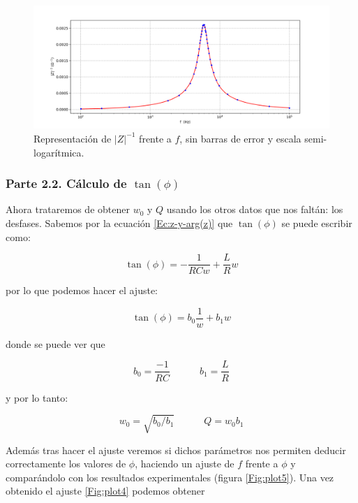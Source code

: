 \documentclass[12pt,a4paper]{article}
\newcommand{\tquad}{\quad \quad \quad}
\begin{document}
\begin{figure}[h!] \centering
\includegraphics[scale=0.60]{plot5.png}
\caption{Representación de $|Z|^{-1}$ frente a $f$, sin barras de error y escala semi-logarítmica.}
\label{Fig:plot3}
\end{figure}

\subsubsection{Parte 2.2. Cálculo de $\tan (\phi)$}

Ahora trataremos de obtener $w_0$ y $Q$ usando los otros datos que nos faltán: los desfases. Sabemos por la ecuación \ref{Ec:z-y-arg(z)} que $\tan (\phi)$ se puede escribir como:

$$
\tan (\phi) =  - \dfrac{1}{R C w} + \dfrac{L}{R} w
$$

por lo que podemos hacer el ajuste:

\begin{equation}
\tan (\phi) = b_0 \dfrac{1}{w} + b_1 w \label{Ec:ajuste2}
\end{equation}

donde se puede ver que

\begin{equation}
b_0 = \dfrac{-1}{RC} \tquad b_1 = \dfrac{L}{R} \label{Ec:parametros2}
\end{equation}

y por lo tanto:

\begin{equation}
w_0= \sqrt{b_0/b_1} \tquad Q =  w_0 b_1 \label{Ec:valores2}
\end{equation}

Además tras hacer el ajuste veremos si dichos parámetros nos permiten deducir correctamente los valores de $\phi$, haciendo un ajuste de $f$ frente a $\phi$ y comparándolo con los resultados experimentales (figura \ref{Fig:plot5}). Una vez obtenido el ajuste \ref{Fig:plot4} podemos obtener\\
\end{document}
